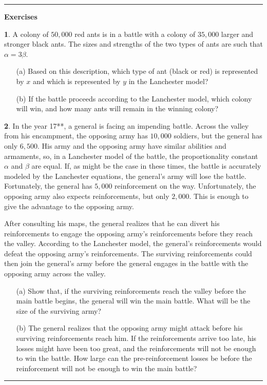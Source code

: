 \documentclass[reqno]{immbook}
\numberwithin{equation}{chapter}
\numberwithin{question}{section}
\numberwithin{theorem}{chapter}
\numberwithin{figure}{chapter}
\theoremstyle{definition}
\newtheorem{exercise}{}[section]
\newenvironment{exercises}%
{%
\medskip\hrule\medskip\noindent\textbf{Exercises}%
}%
{%
\medskip\hrule
}
\begin{document}
\newpage
\begin{exercises}
\begin{exercise}
\label{ex:lanchester_ants}
A colony of $50,000$ red ants is in a battle
with a colony of $35,000$ larger and stronger black ants.
The sizes and strengths of the two types of ants
are such that $\alpha=3\beta$.
\begin{enumerate}
\item[(a)] Based on this description, which type of ant
(black or red) is represented by $x$
and which is represented by $y$ in the
Lanchester model?
\item[(b)] If the battle proceeds according to the Lanchester
model, which colony will win, and how many ants will
remain in the winning colony?
\end{enumerate}
\end{exercise}
\begin{exercise}
\label{ex:lanchester_general}
In the year 17**, a general is facing an impending battle.
Across the valley from his encampment, the opposing
army has $10,000$ soldiers, but the general has only $6,500$.
His army and the opposing army have similar abilities
and armaments, so, in a Lanchester model of the battle,
the proportionality constant $\alpha$ and $\beta$
are equal.
If, as might be the case in these times, the battle
is accurately modeled by the Lanchester equations,
the general's army will lose the battle.
Fortunately, the general has $5,000$ reinforcement
on the way.  Unfortunately, the opposing army
also expects reinforcements, but only $2,000$.
This is enough to give the advantage to the opposing
army.

After consulting his maps, the general realizes that
he can divert his reinforcements to engage the
opposing army's reinforcements before they
reach the valley. According to the Lanchester model,
the general's reinforcements would defeat
the opposing army's reinforcements.  The surviving
reinforcements could then join the general's army
before the general engages in the battle with the
opposing army across the valley.

\begin{enumerate}
\item[(a)] Show that, if the surviving reinforcements reach the valley
before the main battle begins, the general will win
the main battle.
What will be the size of the surviving army?
\item[(b)] The general realizes that the opposing army
might attack before his surviving reinforcements
reach him. If the reinforcements arrive too late,
his losses might have been too great, and the
reinforcements will not be enough to win the battle.
How large can the pre-reinforcement losses be before
the reinforcement will not be enough to win the main battle?
\end{enumerate}
\end{exercise}
\end{exercises}
%
\newpage
%
\end{document}
